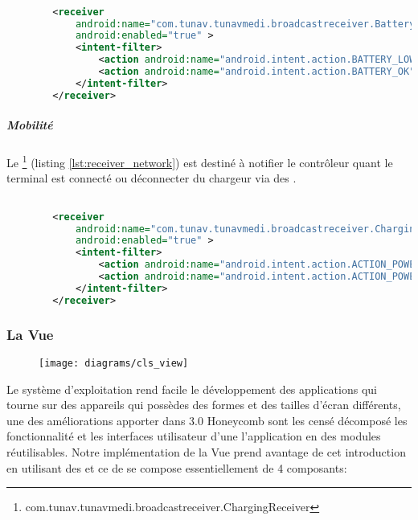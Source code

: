 \begin{lstlisting}[language=xml, label=lst:receiver_battery, caption=Déclaration dans AndroidManifest du BatteryReceiver.]

        <receiver
            android:name="com.tunav.tunavmedi.broadcastreceiver.BatteryReceiver"
            android:enabled="true" >
            <intent-filter>
                <action android:name="android.intent.action.BATTERY_LOW" />
                <action android:name="android.intent.action.BATTERY_OK" />
            </intent-filter>
        </receiver>

\end{lstlisting}

\subparagraph{Mobilité}
Le \footnote{com.tunav.tunavmedi.broadcastreceiver.ChargingReceiver} (listing \ref{lst:receiver_network}) est destiné à notifier le contrôleur quant le terminal est connecté ou déconnecter du  chargeur via des .

\begin{lstlisting}[language=xml, label=lst:receiver_charging, caption=Déclaration dans AndroidManifest ChargingReceivers.]

        <receiver
            android:name="com.tunav.tunavmedi.broadcastreceiver.ChargingReceiver"
            android:enabled="true" >
            <intent-filter>
                <action android:name="android.intent.action.ACTION_POWER_CONNECTED" />
                <action android:name="android.intent.action.ACTION_POWER_DISCONNECTED" />
            </intent-filter>
        </receiver>

\end{lstlisting}

\subsubsection{La Vue}

\begin{figure}
\center
\texttt{[image: diagrams/cls\_view]}
\end{figure}

Le système d'exploitation \android{} rend facile le développement des applications qui tourne sur des appareils qui possèdes des formes et des tailles d’écran différents, une des améliorations apporter dans \android{} 3.0 Honeycomb sont les  censé décomposé les fonctionnalité et les interfaces utilisateur d'une l'application \android{} en des modules réutilisables. Notre implémentation de la Vue prend avantage de cet introduction en utilisant des  et ce de se compose essentiellement de 4 composants:

